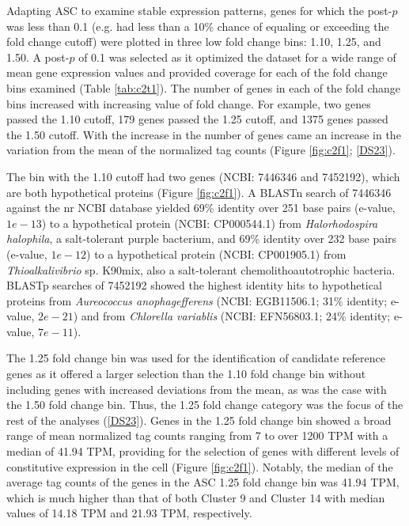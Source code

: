Adapting ASC to examine stable expression patterns, genes for which the post-$p$ was less than 0.1 (e.g. had less than a 10\% chance of equaling or exceeding the fold change cutoff) were plotted in three low fold change bins: 1.10, 1.25, and 1.50. A post-$p$ of 0.1 was selected as it optimized the dataset for a wide range of mean gene expression values and provided coverage for each of the fold change bins examined (Table \ref{tab:c2t1}). The number of genes in each of the fold change bins increased with increasing value of fold change. For example, two genes passed the 1.10 cutoff, 179 genes passed the 1.25 cutoff, and 1375 genes passed the 1.50 cutoff. With the increase in the number of genes came an increase in the variation from the mean of the normalized tag counts (Figure \ref{fig:c2f1}; \ref{DS23}). \par
The bin with the 1.10 cutoff had two genes (NCBI: 7446346 and 7452192), which are both hypothetical proteins (Figure \ref{fig:c2f1}). A BLASTn search of 7446346 against the nr NCBI database yielded 69\% identity over 251 base pairs (e-value, $1e-13$) to a hypothetical protein (NCBI: CP000544.1) from \textit{Halorhodospira halophila}, a salt-tolerant purple bacterium, and 69\% identity over 232 base pairs (e-value, $1e-12$) to a hypothetical protein (NCBI: CP001905.1) from \textit{Thioalkalivibrio} sp. K90mix, also a salt-tolerant chemolithoautotrophic bacteria. BLASTp searches of 7452192 showed the highest identity hits to hypothetical proteins from \textit{Aureococcus anophagefferens} (NCBI: EGB11506.1; 31\% identity; e-value, $2e-21$) and from \textit{Chlorella variablis} (NCBI: EFN56803.1; 24\% identity; e-value, $7e-11$).\par




The 1.25 fold change bin was used for the identification of candidate reference genes as it offered a larger selection than the 1.10 fold change bin without including genes with increased deviations from the mean, as was the case with the 1.50 fold change bin. Thus, the 1.25 fold change category was the focus of the rest of the analyses (\ref{DS23}). Genes in the 1.25 fold change bin showed a broad range of mean normalized tag counts ranging from 7 to over 1200 TPM with a median of 41.94 TPM, providing for the selection of genes with different levels of constitutive expression in the cell (Figure \ref{fig:c2f1}). Notably, the median of the average tag counts of the genes in the ASC 1.25 fold change bin was 41.94 TPM, which is much higher than that of both Cluster 9 and Cluster 14 with median values of 14.18 TPM and 21.93 TPM, respectively. \par

